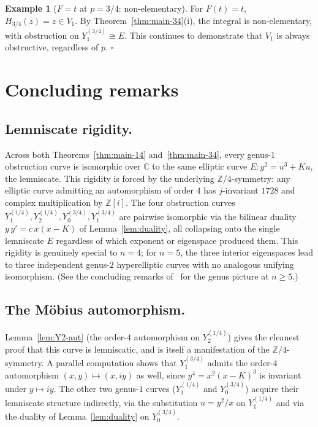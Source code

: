 \documentclass[11pt,a4paper]{article}
\theoremstyle{plain}
\theoremstyle{definition}
\newtheorem{example}[theorem]{Example}
\theoremstyle{remark}
\newcommand{\C}{\mathbb{C}}
\newcommand{\Z}{\mathbb{Z}}
\begin{document}
\begin{example}[$F = t$ at $p = 3/4$: non-elementary]\label{ex:Ft-34}
For $F(t) = t$, $H_{3/4}(z) = z \in V_1$. By Theorem~\ref{thm:main-34}(i), the integral is non-elementary, with obstruction on $Y_1^{(3/4)} \cong E$. This continues to demonstrate that $V_1$ is always obstructive, regardless of $p$. \hfill$\square$
\end{example}

\section{Concluding remarks}\label{sec:concluding}

\subsection*{Lemniscate rigidity.}
Across both Theorems~\ref{thm:main-14} and~\ref{thm:main-34}, every genus-$1$ obstruction curve is isomorphic over $\C$ to the same elliptic curve $E\colon y^2 = u^3 + K u$, the lemniscate. This rigidity is forced by the underlying $\Z/4$-symmetry: any elliptic curve admitting an automorphism of order $4$ has $j$-invariant $1728$ and complex multiplication by $\Z[i]$. The four obstruction curves $Y_1^{(1/4)}, Y_2^{(1/4)}, Y_0^{(3/4)}, Y_1^{(3/4)}$ are pairwise isomorphic via the bilinear duality $y\,y' = c\,x(x-K)$ of Lemma~\ref{lem:duality}, all collapsing onto the single lemniscate $E$ regardless of which exponent or eigenspace produced them. This rigidity is genuinely special to $n = 4$; for $n = 5$, the three interior eigenspaces lead to three independent genus-$2$ hyperelliptic curves with no analogous unifying isomorphism. (See the concluding remarks of~\cite{GoursatCubic} for the genus picture at $n \geq 5$.)

\subsection*{The Möbius automorphism.}
Lemma~\ref{lem:Y2-aut} (the order-$4$ automorphism on $Y_2^{(1/4)}$) gives the cleanest proof that this curve is lemniscatic, and is itself a manifestation of the $\Z/4$-symmetry. A parallel computation shows that $Y_1^{(3/4)}$ admits the order-$4$ automorphism $(x, y) \mapsto (x, iy)$ as well, since $y^4 = x^2(x-K)^3$ is invariant under $y \mapsto iy$. The other two genus-$1$ curves ($Y_1^{(1/4)}$ and $Y_0^{(3/4)}$) acquire their lemniscate structure indirectly, via the substitution $u = y^2/x$ on $Y_1^{(1/4)}$ and via the duality of Lemma~\ref{lem:duality} on $Y_0^{(3/4)}$.
\end{document}
